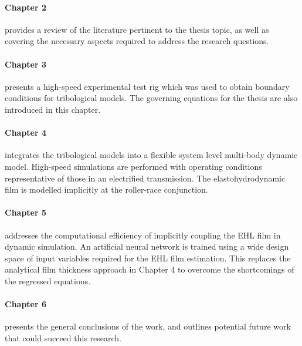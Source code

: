 \paragraph{Chapter 2} provides a review of the literature pertinent to the thesis topic, as well as covering the necessary aspects required to address the research questions.

\paragraph{Chapter 3} presents a high-speed experimental test rig which was used to obtain boundary conditions for tribological models. The governing equations for the thesis are also introduced in this chapter.

\paragraph{Chapter 4} integrates the tribological models into a flexible system level multi-body dynamic model. High-speed simulations are performed with operating conditions representative of those in an electrified transmission. The elastohydrodynamic film is modelled implicitly at the roller-race conjunction.

\paragraph{Chapter 5} addresses the computational efficiency of implicitly coupling the EHL film in dynamic simulation. An artificial neural network is trained using a wide design space of input variables required for the EHL film estimation. This replaces the analytical film thickness approach in Chapter 4 to overcome the shortcomings of the regressed equations.

\paragraph{Chapter 6} presents the general conclusions of the work, and outlines potential future work that could succeed this research.